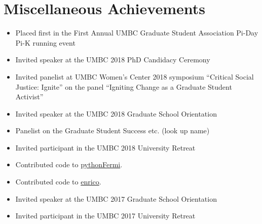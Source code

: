 %
%
%

\section{\texorpdfstring{\color{Blue}Miscellaneous Achievements}{Miscellaneous Achievements}}

\begin{itemize}
%
\item Placed first in the First Annual UMBC Graduate Student Association Pi-Day Pi-K running event
\item Invited speaker at the UMBC 2018 PhD Candidacy Ceremony
\item Invited panelist at UMBC Women's Center 2018 symposium ``Critical Social Justice: Ignite'' on the panel ``Igniting Change as a Graduate Student Activist''
\item Invited speaker at the UMBC 2018 Graduate School Orientation
\item Panelist on the Graduate Student Success etc. (look up name)
\item Invited participant in the UMBC 2018 University Retreat
\item Contributed code to \href{https://github.com/simonbonnefoy/pythonFermi}{pythonFermi}.
\item Contributed code to \href{https://github.com/gammapy/enrico}{enrico}.
\item Invited speaker at the UMBC 2017 Graduate School Orientation
\item Invited participant in the UMBC 2017 University Retreat
\end{itemize}
